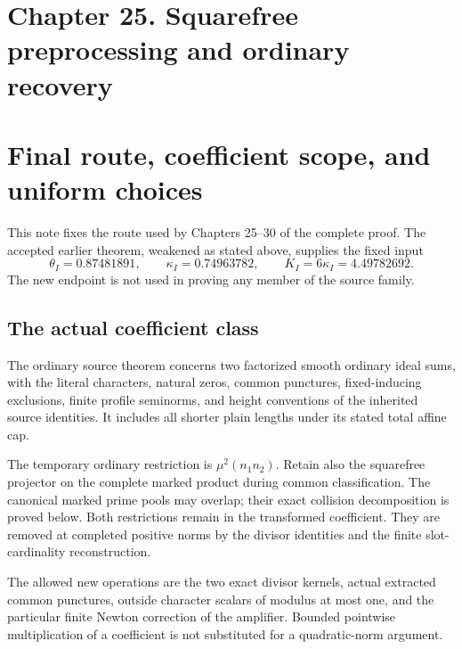 \hypertarget{sources:chapter-25.-squarefree-preprocessing-and-ordinary-recovery}{%
\section{Chapter 25. Squarefree preprocessing and ordinary recovery}\label{sources:chapter-25.-squarefree-preprocessing-and-ordinary-recovery}}

\hypertarget{sources:final-route-coefficient-scope-and-uniform-choices}{%
\section{Final route, coefficient scope, and uniform choices}\label{sources:final-route-coefficient-scope-and-uniform-choices}}

This note fixes the route used by Chapters 25--30 of the complete proof. The accepted earlier theorem, weakened as stated above, supplies the fixed input \[
 \theta_I=0.87481891,\qquad \kappa_I=0.74963782,\qquad
 K_I=6\kappa_I=4.49782692.
\] The new endpoint is not used in proving any member of the source family.

\hypertarget{sources:the-actual-coefficient-class}{%
\subsection{The actual coefficient class}\label{sources:the-actual-coefficient-class}}

The ordinary source theorem concerns two factorized smooth ordinary ideal sums, with the literal characters, natural zeros, common punctures, fixed-inducing exclusions, finite profile seminorms, and height conventions of the inherited source identities. It includes all shorter plain lengths under its stated total affine cap.

The temporary ordinary restriction is \(\mu^2(n_1n_2)\). Retain also the squarefree projector on the complete marked product during common classification. The canonical marked prime pools may overlap; their exact collision decomposition is proved below. Both restrictions remain in the transformed coefficient. They are removed at completed positive norms by the divisor identities and the finite slot-cardinality reconstruction.

The allowed new operations are the two exact divisor kernels, actual extracted common punctures, outside character scalars of modulus at most one, and the particular finite Newton correction of the amplifier. Bounded pointwise multiplication of a coefficient is not substituted for a quadratic-norm argument.


